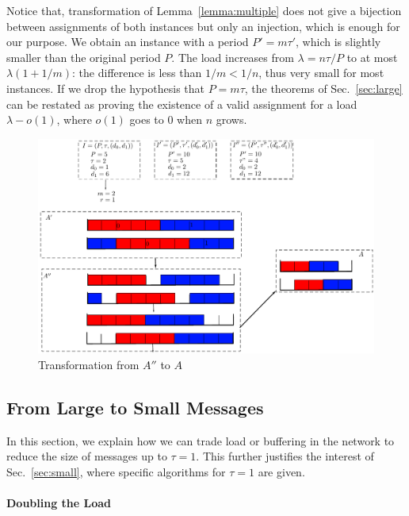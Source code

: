 \documentclass[a4paper,UKenglish,cleveref, autoref, thm-restate]{lipics-v2019}
\begin{document}
Notice that, transformation of Lemma~\ref{lemma:multiple} does not give a bijection between assignments of both instances but only an injection, which is enough for our purpose. 
We obtain an instance with a period $P'= m\tau'$, which is slightly smaller than the original period $P$. The load increases from $\lambda = n \tau / P$ to at most $\lambda (1 + 1/m)$: the difference is less than $1/m < 1/n$, thus very small for most instances. If we drop the hypothesis that $P=m\tau$, the theorems of Sec.~\ref{sec:large}
can be restated as proving the existence of a valid assignment for a load $\lambda - o(1)$, where $o(1)$ goes to $0$ when $n$ grows. 

\begin{figure}
 \begin{center}
\includegraphics[scale=0.75]{multipleperiod}
\end{center}
\caption{Transformation from $A''$ to $A$}
\label{fig:multipleperiod}
\end{figure}

\subsection{From Large to Small Messages}\label{sec:reduction}


In this section, we explain how we can trade load or buffering in the network to reduce the size of messages up to $\tau = 1$. This further justifies the interest of Sec.~\ref{sec:small}, where specific algorithms for $\tau = 1$ are given.

\paragraph*{Doubling the Load}
\end{document}

